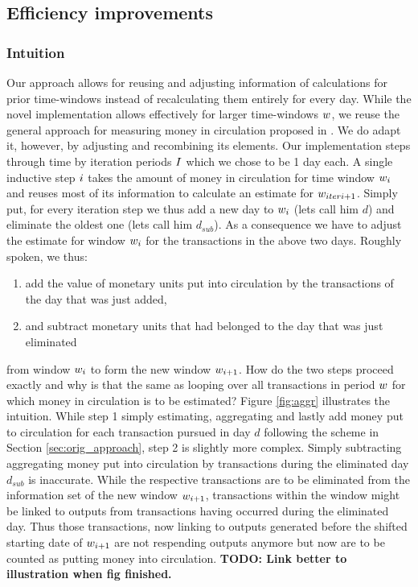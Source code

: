 \subsection{Efficiency improvements}
\label{sec:novel_impl}%

\subsubsection{Intuition}
\label{sec:novel_impl_intuition}%
Our approach allows for reusing and adjusting information of calculations for prior time-windows instead of recalculating them entirely for every day. %
While the novel implementation allows effectively for larger time-windows \({{w}}\), we reuse the general approach for measuring money in circulation proposed in \cite{pernice2019cryptocurrencies}. %
We do adapt it, however, by adjusting and recombining its elements. %
Our implementation steps through time by iteration periods \({I}\) which we chose to be 1 day each. %
A single inductive step \({i}\) takes the amount of money in circulation for time window \({w}_{i}\) and reuses most of its information to calculate an estimate for \({w}_{iteri+1}\). %
Simply put, for every iteration step we thus add a new day to \({w}_{{i}}\) (lets call him \(d\)) and eliminate the oldest one (lets call him \(d_{sub}\)). %
As a consequence we have to adjust the estimate for window \({w}_{i}\) for the transactions in the above two days. %
Roughly spoken, we thus:
\begin{enumerate}
\item add the value of monetary units put into circulation by the transactions of the day that was just added, %
\item and subtract monetary units that had belonged to the day that was just eliminated %
\end{enumerate}
from window \({w}_{{i}}\) to form the new window \({w}_{{i}+1}\). %
How do the two steps proceed exactly and why is that the same as looping over all transactions in period \({w}\) for which money in circulation is to be estimated?
Figure \ref{fig:aggr} illustrates the intuition. %
While step 1 simply estimating, aggregating and lastly add money put to circulation for each transaction pursued in day \(d\) following the scheme in Section \ref{sec:orig_approach}, step 2 is slightly more complex. %
Simply subtracting aggregating money put into circulation by transactions during the eliminated day \(d_{sub}\) is inaccurate. %
While the respective transactions are to be eliminated from the information set of the new window \({w}_{{i}+1}\), transactions within the window might be linked to outputs from transactions having occurred during the eliminated day. %
Thus those transactions, now linking to outputs generated before the shifted starting date of \({w}_{{i}+1}\) are not respending outputs anymore but now are to be counted as putting money into circulation. %
\textbf{TODO: Link better to illustration when fig finished.}



